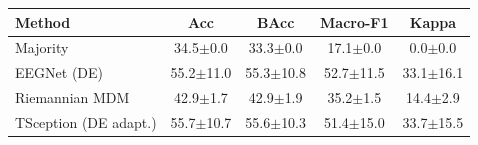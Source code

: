 \begin{tabular}{lcccc}
\toprule
Method & Acc & BAcc & Macro-F1 & Kappa \\
\midrule
Majority & 34.5$\pm$0.0 & 33.3$\pm$0.0 & 17.1$\pm$0.0 & 0.0$\pm$0.0 \\
EEGNet (DE) & 55.2$\pm$11.0 & 55.3$\pm$10.8 & 52.7$\pm$11.5 & 33.1$\pm$16.1 \\
Riemannian MDM & 42.9$\pm$1.7 & 42.9$\pm$1.9 & 35.2$\pm$1.5 & 14.4$\pm$2.9 \\
TSception (DE adapt.) & 55.7$\pm$10.7 & 55.6$\pm$10.3 & 51.4$\pm$15.0 & 33.7$\pm$15.5 \\
\bottomrule
\end{tabular}